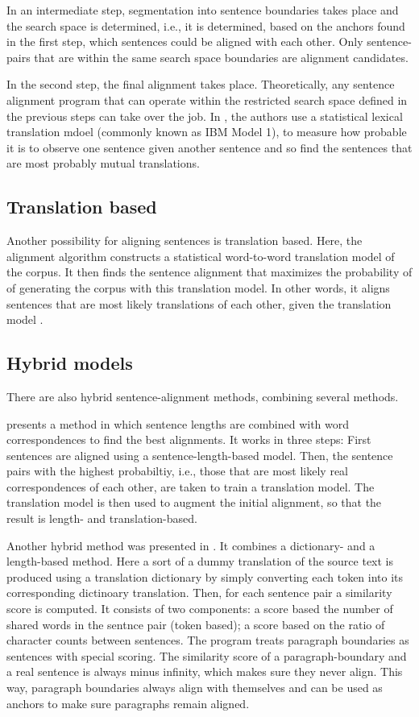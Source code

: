In an intermediate step, segmentation into sentence boundaries takes place and the search space is determined, i.e., it is determined, based on the anchors found in the first step, which sentences could be aligned with each other. 
Only sentence-pairs that are within the same search space boundaries are alignment candidates.

In the second step, the final alignment takes place. 
Theoretically, any sentence alignment program that can operate within the restricted search space defined in the previous steps can take over the job. 
In \cite{simard-plamondon-1996-bilingual}, the authors use a statistical lexical translation mdoel (commonly known as IBM Model 1), to measure how probable it is to observe one sentence given another sentence and so find the sentences that are most probably mutual translations.

\subsection{Translation based}

Another possibility for aligning sentences is translation based. 
Here, the alignment algorithm constructs a statistical word-to-word translation model of the corpus. 
It then finds the sentence alignment that maximizes the probability of of generating the corpus with this translation model. 
In other words, it aligns sentences that are most likely translations of each other, given the translation model \autocite{chen-1993-aligning}. 

\subsection{Hybrid models}
There are also hybrid sentence-alignment methods, combining several methods.


\cite{moore2002fast} presents a method in which sentence lengths are combined with word correspondences to find the best alignments. 
It works in three steps:
First sentences are aligned using a sentence-length-based model. 
Then, the sentence pairs with the highest probabiltiy, i.e., those that are most likely real correspondences of each other, are taken to train a translation model. 
The translation model is then used to augment the initial alignment, so that the result is length- and translation-based.

Another hybrid method was presented in \cite{hunalign}. 
It combines a dictionary- and a length-based method.
Here a sort of a dummy translation of the source text is produced using a translation dictionary by simply converting each token into its corresponding dictinoary translation. 
Then, for each sentence pair a similarity score is computed. 
It consists of two components: a score based the number of shared words in the sentnce pair (token based);  a score based on the ratio of character counts between sentences. 
The program treats paragraph boundaries as sentences with special scoring. 
The similarity score of a paragraph-boundary  and a real sentence is always minus infinity, which makes sure they never align. This way, paragraph boundaries always align with themselves and can be used as anchors to make sure paragraphs remain aligned.

